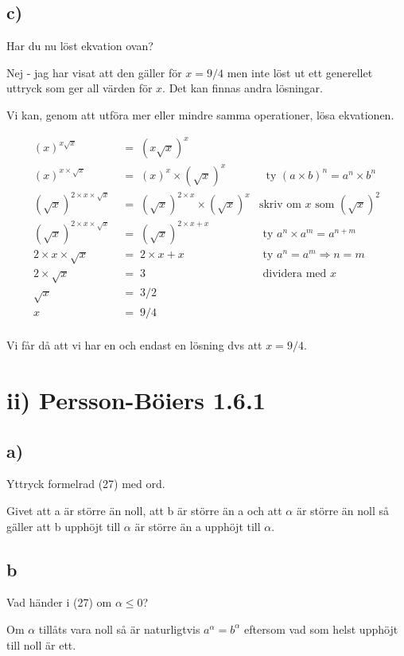 \documentclass[a4paper, 11pt]{article}
\begin{document}
\subsection*{ c)}

Har du nu löst ekvation ovan?

\vspace{10pt}

\noindent Nej - jag har visat att den gäller för $x = 9/4$ men inte löst ut ett
generellet uttryck som ger all värden för $x$. Det kan finnas andra
lösningar. 

Vi kan, genom att utföra mer eller mindre samma operationer, lösa ekvationen. 

\begin{align*}
  (x)^{x \sqrt{x}}   &\; =\;   (x\sqrt{x})^{x}  & \\
  (x)^{x \times \sqrt{x}}  &\; =\;  (x)^{x} \times  (\sqrt{x})^{x}   &\; \text{ ty\ } (a \times b)^n = a^n \times b^n\\
  (\sqrt{x})^{2 \times x \times \sqrt{x}} &\; =\;  (\sqrt{x})^{2\times x} \times (\sqrt{x})^{x}  & \text{skriv om\ } x \text{\ som\ } (\sqrt{x})^2  \\
  (\sqrt{x})^{2 \times x \times \sqrt{x}} &\; =\;  (\sqrt{x})^{2\times x + x} & \text{ ty\ } a^n \times a^m = a^{n+m}\\
  2 \times x \times \sqrt{x} &\; =\;  2\times x + x & \text{ ty\ } a^n = a^m \Rightarrow n = m \\
  2 \times \sqrt{x} &\; =\; 3 & \text{ dividera med\ } x\\
  \sqrt{x} &\; =\; 3/2 & \\
  x &\; =\; 9/4 & \\
\end{align*}

\noindent Vi får då att vi har en och endast en lösning dvs att $x = 9/4$.

\section*{ii) Persson-Böiers 1.6.1}

\subsection*{a)}

Yttryck formelrad (27) med ord.

\vspace{10pt}

\noindent  Givet att a är större än noll, att b är större än a och att $\alpha$
är större än noll så gäller att b upphöjt till $\alpha$ är större än a
upphöjt till $\alpha$.


\subsection*{b}

Vad händer i (27) om $\alpha \leq 0$?

\vspace{10pt}

\noindent  Om $\alpha$ tillåts vara noll så är naturligtvis $a^\alpha = b^\alpha$
eftersom vad som helst upphöjt till noll är ett.

  
\end{document}
